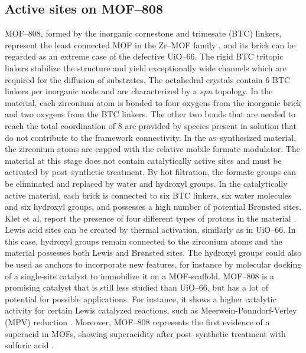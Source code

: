 \subsection*{Active sites on MOF--808}
MOF--808, formed by the inorganic  cornestone and trimesate (BTC) linkers, represent the least connected MOF in the Zr--MOF family \cite{furukawa2014water}, and its brick can be regarded as an extreme case of the defective UiO--66. The rigid BTC tritopic linkers stabilize the structure and yield exceptionally wide channels which are required for the diffusion of substrates. The octahedral crystals contain 6 BTC linkers per inorganic node and are characterized by a \textit{spn} topology. 
In the material, each zirconium atom is bonded to four oxygens from the inorganic brick and two oxygens from the BTC linkers. The other two bonds that are needed to reach the total coordination of 8 are provided by species present in solution that do not contribute to the framework connectivity. 
\npar
In the as--synthesized material, the zirconium atoms are capped with the relative mobile formate modulator. The material at this stage does not contain catalytically active sites and must be activated by post--synthetic treatment. By hot filtration, the formate groups can be eliminated and replaced by water and hydroxyl groups. In the catalytically active material, each brick is connected to six BTC linkers, six water molecules and six hydroxyl groups, and possesses a high number of potential Br\o{}nsted sites. Klet et al. report the presence of four different types of protons in the material \cite{klet2016evaluation}. Lewis acid sites can be created by thermal activation, similarly as in UiO--66. In this case, hydroxyl groups remain connected to the zirconium atoms and the material possesses both Lewis and Br\o{}nsted sites. The hydroxyl groups could also be used as anchors to incorporate new features, for instance by molecular docking of a single-site catalyst to immobilize it on a MOF-scaffold. MOF--808 is a promising catalyst that is still less studied than UiO--66, but has a lot of potential for possible applications. For instance, it shows a higher catalytic activity for certain Lewis catalyzed reactions, such as Meerwein-Ponndorf-Verley (MPV) reduction \cite{plessers2016zr, mautschke2018catalytic}. 
Moreover, MOF--808 represents the first evidence of a superacid in MOFs, showing superacidity after post--synthetic treatment with sulfuric acid \cite{jiang2014superacidity}.

